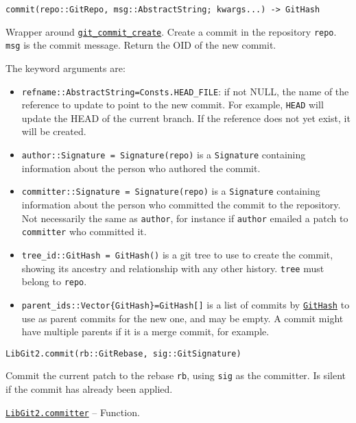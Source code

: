 \begin{adjustwidth}{2em}{0pt}


\begin{verbatim}
commit(repo::GitRepo, msg::AbstractString; kwargs...) -> GitHash
\end{verbatim}

Wrapper around \href{https://libgit2.org/libgit2/\#HEAD/group/commit/git\_commit\_create}{\texttt{git\_commit\_create}}. Create a commit in the repository \texttt{repo}. \texttt{msg} is the commit message. Return the OID of the new commit.

The keyword arguments are:

\begin{itemize}
\item \texttt{refname::AbstractString=Consts.HEAD\_FILE}: if not NULL, the name of the reference to update to point to the new commit. For example, \texttt{{\textquotedbl}HEAD{\textquotedbl}} will update the HEAD of the current branch. If the reference does not yet exist, it will be created.


\item \texttt{author::Signature = Signature(repo)} is a \texttt{Signature} containing information about the person who authored the commit.


\item \texttt{committer::Signature = Signature(repo)} is a \texttt{Signature} containing information about the person who committed the commit to the repository. Not necessarily the same as \texttt{author}, for instance if \texttt{author} emailed a patch to \texttt{committer} who committed it.


\item \texttt{tree\_id::GitHash = GitHash()} is a git tree to use to create the commit, showing its ancestry and relationship with any other history. \texttt{tree} must belong to \texttt{repo}.


\item \texttt{parent\_ids::Vector\{GitHash\}=GitHash[]} is a list of commits by \hyperlink{202290709580230708}{\texttt{GitHash}} to use as parent commits for the new one, and may be empty. A commit might have multiple parents if it is a merge commit, for example.

\end{itemize}



\begin{lstlisting}
LibGit2.commit(rb::GitRebase, sig::GitSignature)
\end{lstlisting}

Commit the current patch to the rebase \texttt{rb}, using \texttt{sig} as the committer. Is silent if the commit has already been applied.



\end{adjustwidth}
\hypertarget{4819166445750615913}{} 
\hyperlink{4819166445750615913}{\texttt{LibGit2.committer}}  -- {Function.}

